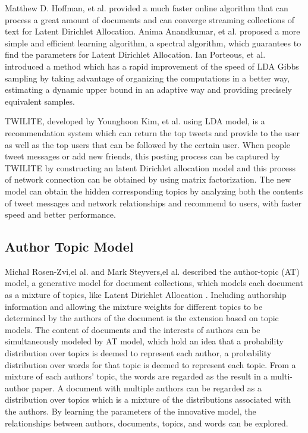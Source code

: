 Matthew D. Hoffman, et al.\cite{hoffman2010online} provided a much faster online algorithm that can process a great amount of documents and can converge streaming collections of text for Latent Dirichlet Allocation. Anima Anandkumar, et al.\cite{anandkumar2012spectral} proposed a more simple and efficient learning algorithm, a spectral algorithm, which guarantees to find the parameters for Latent Dirichlet Allocation. Ian Porteous, et al.\cite{krestel2009latent} introduced a method which has a rapid improvement of the speed of LDA Gibbs sampling by taking advantage of organizing the computations in a better way, estimating a dynamic upper bound in an adaptive way and providing precisely equivalent samples.

TWILITE, developed by Younghoon Kim, et al.\cite{kim2014twilite}  using LDA model, is a recommendation system which can return the top tweets and provide to the user as well as the top users that can be followed by the certain user. When people tweet messages or add new friends, this posting process can be captured by TWILITE by constructing an latent Dirichlet allocation model and this process of network connection can be obtained by using matrix factorization. The new model can obtain the hidden corresponding topics  by analyzing both the contents of tweet messages and network relationships  and recommend to users, with faster speed and better performance.

\subsection{Author Topic Model}

Michal Rosen-Zvi,el al.\cite{rosen2004author} and Mark Steyvers,el al.\cite{steyvers2004probabilistic} described the author-topic (AT) model, a generative model for document collections, which models each document as a mixture of topics, like Latent Dirichlet Allocation \cite{blei2003latent}. Including authorship information and allowing the mixture weights for different topics to be determined by the authors of the document is the extension based on topic models. The content of documents and the interests of authors can be simultaneously modeled by AT model, which hold an idea that a probability distribution over topics is deemed to represent each author,  a probability distribution over words for that topic is deemed to represent each topic. From a mixture of each authors’ topic, the words are regarded as the result in a multi-author paper. A document with multiple authors can be regarded as a distribution over topics which is a mixture of the distributions associated with the authors. By learning the parameters of the innovative model, the relationships between authors, documents, topics, and words can be explored.

